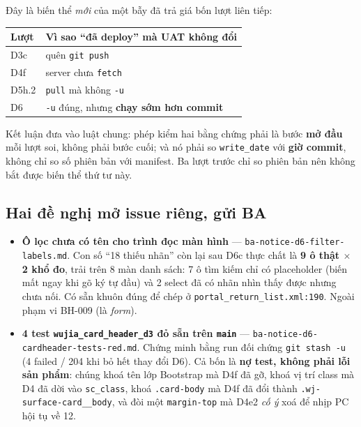 Đây là biến thể \emph{mới} của một bẫy đã trả giá bốn lượt liên tiếp:

\begin{center}
\begin{tabular}{ll}
\hline
Lượt & Vì sao ``đã deploy'' mà UAT không đổi \\
\hline
D3c   & quên \texttt{git push} \\
D4f   & server chưa \texttt{fetch} \\
D5h.2 & \texttt{pull} mà không \texttt{-u} \\
D6    & \texttt{-u} đúng, nhưng \textbf{chạy sớm hơn commit} \\
\hline
\end{tabular}
\end{center}

Kết luận đưa vào luật chung: phép kiểm hai bằng chứng phải là bước \textbf{mở đầu} mỗi lượt soi,
không phải bước cuối; và nó phải so \texttt{write\_date} với \textbf{giờ commit}, không chỉ so số
phiên bản với manifest. Ba lượt trước chỉ so phiên bản nên không bắt được biến thể thứ tư này.

\subsection*{Hai đề nghị mở issue riêng, gửi BA}

\begin{itemize}
\item \textbf{Ô lọc chưa có tên cho trình đọc màn hình} --- \texttt{ba-notice-d6-filter-labels.md}.
  Con số ``18 thiếu nhãn'' còn lại sau D6c thực chất là \textbf{9 ô thật $\times$ 2 khổ đo}, trải
  trên 8 màn danh sách: 7 ô tìm kiếm chỉ có placeholder (biến mất ngay khi gõ ký tự đầu) và 2
  select đã có nhãn nhìn thấy được nhưng chưa nối. Có sẵn khuôn đúng để chép ở
  \texttt{portal\_return\_list.xml:190}. Ngoài phạm vi BH-009 (là \emph{form}).
\item \textbf{4 test \texttt{wujia\_card\_header\_d3} đỏ sẵn trên \texttt{main}} ---
  \texttt{ba-notice-d6-cardheader-tests-red.md}. Chứng minh bằng run đối chứng \texttt{git stash -u}
  (4 failed / 204 khi bỏ hết thay đổi D6). Cả bốn là \textbf{nợ test, không phải lỗi sản phẩm}:
  chúng khoá tên lớp Bootstrap mà D4f đã gỡ, khoá vị trí class mà D4 đã dời vào \texttt{sc\_class},
  khoá \texttt{.card-body} mà D4f đã đổi thành \texttt{.wj-surface-card\_\_body}, và đòi một
  \texttt{margin-top} mà D4e2 \emph{cố ý} xoá để nhịp PC hội tụ về 12.
\end{itemize}

